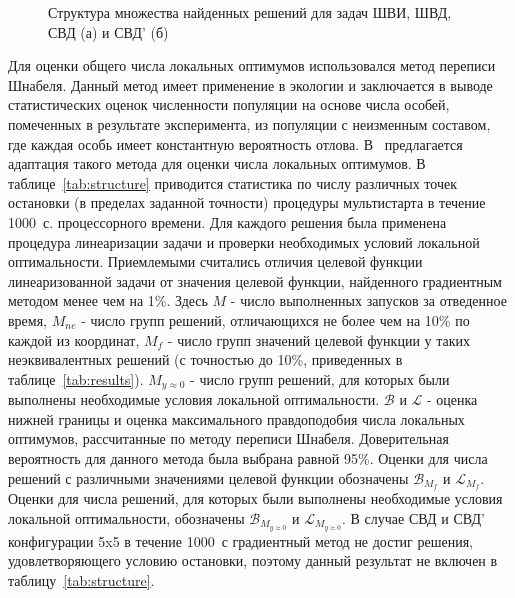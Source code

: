 \begin{figure}
\centering
    \begin{minipage}[h]{0.8\linewidth}
    \end{minipage}
    \begin{minipage}[h]{0.8\linewidth}
    \end{minipage}
    \vspace{0.7em}
    \caption{Структура множества найденных решений для задач ШВИ, ШВД, СВД (а) и СВД' (б)}
    \label{ris:fit_dist}
\end{figure}

Для оценки общего числа локальных оптимумов использовался метод переписи Шнабеля. Данный метод имеет применение в экологии и заключается в
выводе статистических оценок численности популяции на основе числа особей, помеченных в результате эксперимента, из популяции с неизменным
составом, где каждая особь имеет константную вероятность отлова. В~\cite{eremeev:confidence} предлагается адаптация такого метода для оценки числа локальных оптимумов. В таблице~\ref{tab:structure} приводится статистика по числу различных точек остановки (в пределах заданной точности) процедуры мультистарта в течение 1000~с. процессорного времени. Для каждого решения была применена процедура линеаризации задачи и проверки необходимых условий локальной оптимальности. Приемлемыми считались отличия целевой функции линеаризованной задачи от значения целевой функции, найденного градиентным методом менее чем на 1\%. Здесь {$M$} - число выполненных запусков за отведенное время, $M_{ne}$ - число групп решений, отличающихся не более чем на 10\% по каждой из координат, {$M_{f}$} - число групп значений целевой функции у таких неэквивалентных решений (с точностью до 10\%, приведенных в таблице~\ref{tab:results}). {$M_{y\approx0}$} - число групп решений, для которых были выполнены необходимые условия локальной оптимальности. $\mathcal{B}$ и $\mathcal{L}$ - оценка нижней границы и оценка максимального правдоподобия числа локальных оптимумов, рассчитанные по методу переписи Шнабеля. Доверительная вероятность для данного метода была выбрана равной 95\%. Оценки для числа решений с различными значениями целевой функции обозначены $\mathcal{B}_{M_f}$ и $\mathcal{L}_{M_f}$. Оценки для числа решений, для которых были выполнены необходимые условия локальной оптимальности, обозначены $\mathcal{B}_{M_{y\approx0}}$ и $\mathcal{L}_{M_{y\approx0}}$.
В случае СВД и СВД' конфигурации 5x5 в течение 1000~с градиентный метод не достиг решения, удовлетворяющего условию остановки, поэтому
данный результат не включен в таблицу~\ref{tab:structure}.

